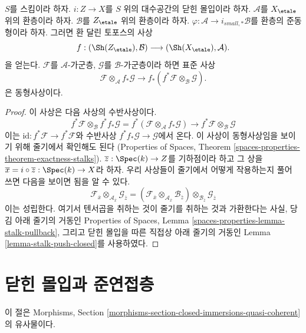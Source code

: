 \begin{lemma}
\label{lemma-closed-immersion-rings}
$S$를 스킴이라 하자. $i : Z \to X$를 $S$ 위의 대수공간의
닫힌 몰입이라 하자. $\mathcal{A}$를 $X_\etale$ 위의 환층이라 하자.
$\mathcal{B}$를 $Z_\etale$ 위의 환층이라 하자.
$\varphi : \mathcal{A} \to i_{small, *}\mathcal{B}$를 환층의
준동형이라 하자. 그러면 환 달린 토포스의 사상
$$
f : (\Sh(Z_\etale), \mathcal{B}) \longrightarrow (\Sh(X_\etale), \mathcal{A}).
$$
을 얻는다. $\mathcal{F}$를 $\mathcal{A}$-가군층,
$\mathcal{G}$를 $\mathcal{B}$-가군층이라 하면 표준 사상
$$
\mathcal{F} \otimes_\mathcal{A} f_*\mathcal{G}
\longrightarrow
f_*(f^*\mathcal{F} \otimes_\mathcal{B} \mathcal{G}).
$$
은 동형사상이다.
\end{lemma}

\begin{proof}
이 사상은 다음 사상의 수반사상이다.
$$
f^*\mathcal{F} \otimes_\mathcal{B}
f^* f_*\mathcal{G} =
f^*(\mathcal{F} \otimes_\mathcal{A} f_*\mathcal{G})
\longrightarrow
f^*\mathcal{F} \otimes_\mathcal{B} \mathcal{G}
$$
이는 $\text{id} : f^*\mathcal{F} \to f^*\mathcal{F}$와
수반사상 $f^* f_*\mathcal{G} \to \mathcal{G}$에서 온다.
이 사상이 동형사상임을 보이기 위해 줄기에서 확인해도 된다
(Properties of Spaces, Theorem
\ref{spaces-properties-theorem-exactness-stalks}).
$\overline{z} : \Spec(k) \to Z$를 기하점이라 하고 그 상을
$\overline{x} = i \circ \overline{z} : \Spec(k) \to X$라 하자.
우리 사상들이 줄기에서 어떻게 작용하는지 풀어 쓰면 다음을
보이면 됨을 알 수 있다.
$$
\mathcal{F}_{\overline{x}}
\otimes_{\mathcal{A}_{\overline{x}}}
\mathcal{G}_{\overline{z}} =
(\mathcal{F}_{\overline{x}}
\otimes_{\mathcal{A}_{\overline{x}}}
\mathcal{B}_{\overline{z}}) \otimes_{\mathcal{B}_{\overline{z}}}
\mathcal{G}_{\overline{z}}
$$
이는 성립한다. 여기서 텐서곱을 취하는 것이 줄기를 취하는 것과
가환한다는 사실, 당김 아래 줄기의 거동인 Properties of Spaces,
Lemma \ref{spaces-properties-lemma-stalk-pullback}, 그리고 닫힌 몰입을
따른 직접상 아래 줄기의 거동인 Lemma
\ref{lemma-stalk-push-closed}를 사용하였다.
\end{proof}

\section{닫힌 몰입과 준연접층}
\label{section-closed-immersions-quasi-coherent}

\noindent
이 절은 Morphisms, Section
\ref{morphisms-section-closed-immersions-quasi-coherent}의 유사물이다.

